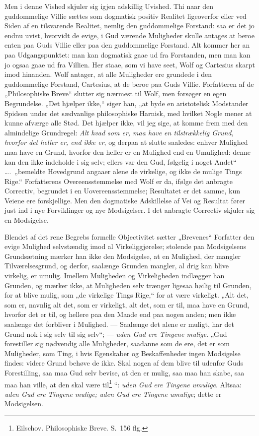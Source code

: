 \documentclass[12pt]{book}
\newcommand{\opage}[1]{\marginnote{\footnotesize\textit{[#1]}}}
\begin{document}
Men i denne Vished skjuler sig igjen adskillig Uvished.
\opage{231}Thi naar den guddommelige Villie sættes som dogmatisk positiv Realitet ligeoverfor eller ved Siden af en tilsvarende Realitet, nemlig den guddommelige Forstand: saa er det jo endnu uvist, hvorvidt de evige, i Gud værende Muligheder skulle antages at beroe enten paa Guds Villie eller paa den guddommelige Forstand. Alt kommer her an paa Udgangspunktet: man kan dogmatisk gaae ud fra Forstanden, men man kan jo ogsaa gaae ud fra Villien. Her staae, som vi have seet, Wolf og Cartesius skarpt imod hinanden. Wolf antager, at alle Muligheder ere grundede i den guddommelige Forstand, Cartesius, at de beroe paa Guds Villie. Forfatteren af de „Philosophiske Breve“ slutter sig nærmest til Wolf, men forsøger en egen Begrundelse. „Det hjælper ikke,“ siger han, „at byde en aristotelisk Modstander Spidsen under det sædvanlige philosophiske Harnisk, med hvilket Nogle mener at kunne afværge alle Stød. Det hjælper ikke, vil jeg sige, at komme frem med den almindelige Grundregel: \emph{Alt hvad som er, maa have en tilstrækkelig Grund, hvorfor det heller er, end ikke er}, og derpaa at slutte saaledes: enhver Mulighed maa have en Grund, hvorfor den heller er en Mulighed end en Umulighed: denne kan den ikke indeholde i sig selv; ellers var den Gud, følgelig i noget Andet“ \dots.\ „bemeldte Hovedgrund angaaer alene de virkelige, og ikke de mulige Tings Rige.“ Forfatterens Overeensstemmelse med Wolf er da, ifølge det anbragte Correctiv, begrundet i en Uovereensstemmelse; Resultatet er det samme, kun Veiene ere forskjellige. Men den dogmatiske Adskillelse af Vei og Resultat fører just ind i nye Forviklinger og nye Modsigelser. I det anbragte Correctiv skjuler sig en Modsigelse.

Blendet af det rene Begrebs formelle Objectivitet sætter „Brevenes“ Forfatter den evige Mulighed selvstændig imod al Virkeliggjørelse; stolende paa Modsigelsens Grundsætning mærker han ikke den Modsigelse, at en Mulighed, der mangler Tilværelsesgrund, og derfor, saalænge Grunden mangler, al%
\opage{232}drig kan blive virkelig, er umulig. Imellem Muligheden og Virkeligheden indlægger han Grunden, og mærker ikke, at Muligheden selv trænger ligesaa høilig til Grunden, for at blive mulig, som „de virkelige Tings Rige,“ for at være virkeligt. „Alt det, som er, navnlig alt det, som er virkeligt, alt det, som er til, maa have en Grund, hvorfor det er til, og hellere paa den Maade end paa nogen anden; men ikke saalænge det forbliver i Mulighed. --- Saalænge det alene er muligt, har det Grund nok i sig selv til sig selv“; --- \emph{uden Gud ere Tingene mulige}. „Gud forestiller sig nødvendig alle Muligheder, saadanne som de ere, det er som Muligheder, som Ting, i hvis Egenskaber og Beskaffenheder ingen Modsigelse findes: videre Grund behøve de ikke. Skal nogen af dem blive til udenfor Guds Forestilling, saa maa Gud selv bevise, at den er mulig, saa maa han skabe, saa maa han ville, at den skal være til\footnote{Eilschov. Philosophiske Breve. S.~156 flg.}%
“: \emph{uden Gud ere Tingene umulige}. Altsaa: \emph{uden Gud ere Tingene mulige; uden Gud ere Tingene umulige}; dette er Modsigelsen.
\end{document}
